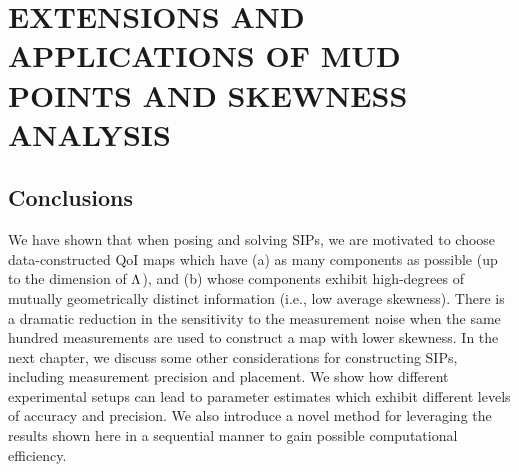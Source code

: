 \chapter{\uppercase{Extensions and Applications of MUD Points and Skewness Analysis} \label{chapter:vector-valued}}



\FloatBarrier

\section{Conclusions}

We have shown that when posing and solving SIPs, we are motivated to choose data-constructed QoI maps which have (a) as many components as possible (up to the dimension of ${\Lambda}$), and (b) whose components exhibit high-degrees of mutually geometrically distinct information (i.e., low average skewness).
There is a dramatic reduction in the sensitivity to the measurement noise when the same hundred measurements are used to construct a map with lower skewness.
In the next chapter, we discuss some other considerations for constructing SIPs, including measurement precision and placement.
We show how different experimental setups can lead to parameter estimates which exhibit different levels of accuracy and precision.
We also introduce a novel method for leveraging the results shown here in a sequential manner to gain possible computational efficiency.
